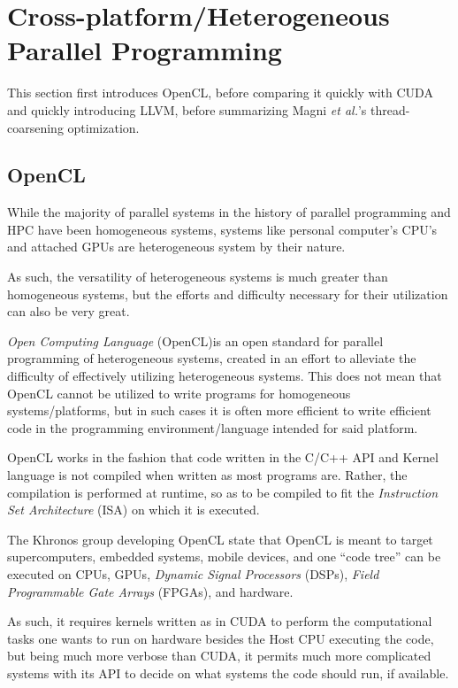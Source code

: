 
\section{Cross-platform/Heterogeneous Parallel Programming}
\label{sec:opencl}

This section first introduces OpenCL, before comparing it quickly with CUDA and quickly introducing LLVM, before summarizing Magni \textit{et al.}'s\cite{Magni:2013:LCE:2503210.2503268} thread-coarsening optimization.

\subsection{OpenCL}

While the majority of parallel systems in the history of parallel programming and HPC have been homogeneous systems, systems like personal computer's CPU's and attached GPUs are heterogeneous system by their nature.

As such, the versatility of heterogeneous systems is much greater than homogeneous systems, but the efforts and difficulty necessary for their utilization can also be very great.

\textit{Open Computing Language} (OpenCL)\texttrademark is an open standard for parallel programming of heterogeneous systems, created in an effort to alleviate the difficulty of effectively utilizing heterogeneous systems.
This does not mean that OpenCL cannot be utilized to write programs for homogeneous systems/platforms, but in such cases it is often more efficient to write efficient code in the programming environment/language intended for said platform.

OpenCL works in the fashion that code written in the C/C++ API and Kernel language is not compiled when written as most programs are.
Rather, the compilation is performed at runtime, so as to be compiled to fit the \textit{Instruction Set Architecture} (ISA) on which it is executed.

The Khronos group developing OpenCL state that OpenCL is meant to target supercomputers, embedded systems, mobile devices, and one ``code tree'' can be executed on CPUs, GPUs, \textit{Dynamic Signal Processors} (DSPs), \textit{Field Programmable Gate Arrays} (FPGAs), and hardware.

As such, it requires kernels written as in CUDA to perform the computational tasks one wants to run on hardware besides the Host CPU executing the code, but being much more verbose than CUDA, it permits much more complicated systems with its API to decide on what systems the code should run, if available.

